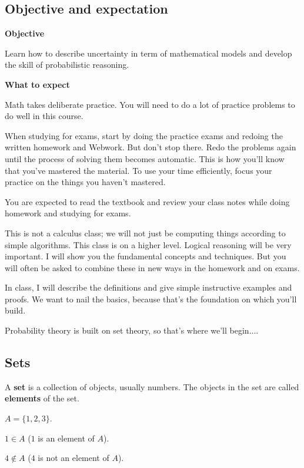   \subsection{Objective and expectation}
  \label{subsec:objective}
  \textbf{Objective}

  Learn how to describe uncertainty in term of mathematical models and develop
  the skill of probabilistic reasoning.

  \textbf{What to expect}

  Math takes deliberate practice. You will need to do a lot of practice problems
  to do well in this course.
  
  When studying for exams, start by doing the practice exams and redoing the
  written homework and Webwork. But don't stop there. Redo the problems again
  until the process of solving them becomes automatic. This is how you'll know
  that you've mastered the material. To use your time efficiently, focus your
  practice on the things you haven't mastered.
  
  You are expected to read the textbook and review your class notes while doing homework and studying for exams.

  This is not a calculus class; we will not just be computing things according
  to simple algorithms. This class is on a higher level. Logical reasoning will
  be very important. I will show you the fundamental concepts and techniques.
  But you will often be asked to combine these in new ways in the homework and
  on exams.

  In class, I will describe the definitions and give simple instructive examples and proofs. We want to nail the basics, because that's the foundation on which you'll build.

  Probability theory is built on set theory, so that's where we'll begin....

  \subsection{Sets}
  \label{subsec:sets}
  \begin{definition}[Sets]
    A \textbf{set} is a collection of objects, usually numbers. The objects in
    the set are called \textbf{elements} of the set.
  \end{definition}

  \begin{example}
    $A = \{1, 2,3\}$.

    $1\in A$ ($1$ is an element of $A$).

    $4 \notin A$ ($4$ is not an element of $A$).
  \end{example}


